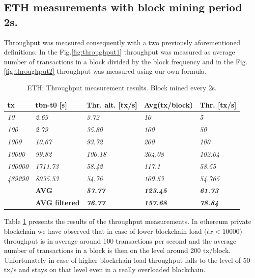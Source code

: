 \subsection{ETH measurements with block mining period 2s.}
Throughput was measured consequently with a two previously aforementioned definitions. In the Fig.\ref{fig:throughput1} throughput was measured as average number of transactions in a block divided by the block frequency and in the Fig.\ref{fig:throughput2} throughput was measured using our own formula. 

\begin{table}[h]
\begin{tabular}{l|l|l|l|l|}
\hline
\multicolumn{1}{|l|}{\textbf{tx}} & \textbf{tbn-t0 {[}s{]}} & \textbf{Thr. alt. {[}tx/s{]}} & \textbf{Avg(tx/block)} & \textbf{Thr. {[}tx/s{]}} \\ \hline
\multicolumn{1}{|l|}{\textit{10}} & \textit{2.69} & \textit{3.72} & \textit{10} & \textit{5} \\ \hline
\multicolumn{1}{|l|}{\textit{100}} & \textit{2.79} & \textit{35.80} & \textit{100} & \textit{50} \\ \hline
\multicolumn{1}{|l|}{\textit{1000}} & \textit{10.67} & \textit{93.72} & \textit{200} & \textit{100} \\ \hline
\multicolumn{1}{|l|}{\textit{10000}} & \textit{99.82} & \textit{100.18} & \textit{204.08} & \textit{102.04} \\ \hline
\multicolumn{1}{|l|}{\textit{100000}} & \textit{1711.73} & \textit{58.42} & \textit{117.1} & \textit{58.55} \\ \hline
\multicolumn{1}{|l|}{\textit{489290}} & \textit{8935.53} & \textit{54.76} & \textit{109.53} & \textit{54.765} \\ \hline
 & \textbf{AVG} & \textit{\textbf{57.77}} & \textit{\textbf{123.45}} & \textit{\textbf{61.73}} \\ \cline{2-5} 
 & \textbf{AVG filtered} & \textit{\textbf{76.77}} & \textit{\textbf{157.68}} & \textit{\textbf{78.84}} \\ \cline{2-5} 
\end{tabular}
\caption{ETH: Throughput measurement results. Block mined every 2s.}
\label{table:2}
\end{table}

Table \ref{table:2} presents the results of the throughput measurements. In ethereum private blockchain we have observed that in case of lower blockchain load ($tx < 10000$) throughput is in average around 100 transactions per second and the average number of transactions in a block is then on the level around 200 tx/block. Unfortunately in case of higher blockchain load  throughput falls to the level of 50 tx/s and stays on that level even in a really overloaded blockchain. 


